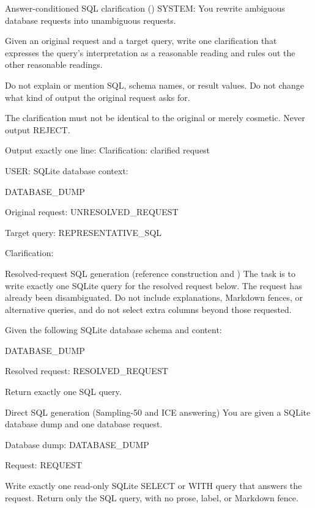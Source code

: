 \begin{promptbox}{Answer-conditioned SQL clarification (\circleclar{})}
SYSTEM:
You rewrite ambiguous database requests into unambiguous requests.

Given an original request and a target query, write one clarification that expresses the query's interpretation as a reasonable reading and rules out the other reasonable readings.

Do not explain or mention SQL, schema names, or result values. Do not change what kind of output the original request asks for.

The clarification must not be identical to the original or merely cosmetic.
Never output REJECT.

Output exactly one line:
Clarification: clarified request

USER:
SQLite database context:

DATABASE_DUMP

Original request:
UNRESOLVED_REQUEST

Target query:
REPRESENTATIVE_SQL

Clarification:
\end{promptbox}

\begin{promptbox}{Resolved-request SQL generation (reference construction and \circleclar{})}
The task is to write exactly one SQLite query for the resolved request below. The request has already been disambiguated. Do not include explanations, Markdown fences, or alternative queries, and do not select extra columns beyond those requested.

Given the following SQLite database schema and content:

DATABASE_DUMP

Resolved request:
RESOLVED_REQUEST

Return exactly one SQL query.
\end{promptbox}

\begin{promptbox}{Direct SQL generation (Sampling-50 and ICE answering)}
You are given a SQLite database dump and one database request.

Database dump:
DATABASE_DUMP

Request:
REQUEST

Write exactly one read-only SQLite SELECT or WITH query that answers the request. 
Return only the SQL query, with no prose, label, or Markdown fence.
\end{promptbox}


